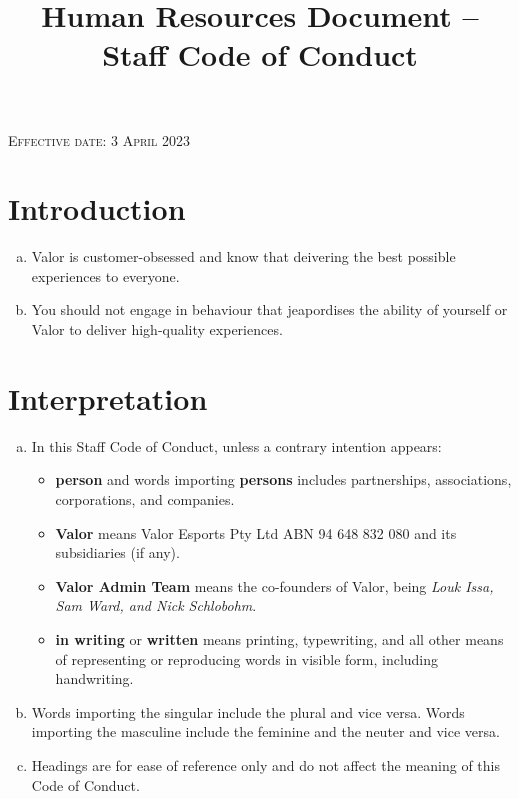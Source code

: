 \documentclass[10pt]{article}
\begin{document}
\title{Human Resources Document -- Staff Code of Conduct}

\textsc{Effective date: 3 April 2023}

\section{Introduction}
\begin{enumerate}[(a)]
	\item Valor is customer-obsessed and know that deivering the best possible experiences to everyone.

	\item You should not engage in behaviour that jeapordises the ability of yourself or Valor to deliver high-quality experiences.
\end{enumerate}


\section{Interpretation}
\begin{enumerate}[(a)]
	\item
	In this Staff Code of Conduct, unless a contrary intention appears:
	\begin{itemize}
		\item[]
		\textbf{person} and words importing \textbf{persons} includes partnerships, associations, corporations, and companies.

		\item[]
		\textbf{Valor} means Valor Esports Pty Ltd ABN 94 648 832 080 and its subsidiaries (if any).

		\item[]
		\textbf{Valor Admin Team} means the co-founders of Valor, being \textit{Louk Issa, Sam Ward, and Nick Schlobohm}.

		\item[]
		\textbf{in writing} or \textbf{written} means printing, typewriting, and all other means of representing or reproducing words in visible form, including handwriting.
	\end{itemize}

	\item
	Words importing the singular include the plural and vice versa. Words importing the masculine include the feminine and the neuter and vice versa.

	\item
	Headings are for ease of reference only and do not affect the meaning of this Code of Conduct.
\end{enumerate}
\end{document}
